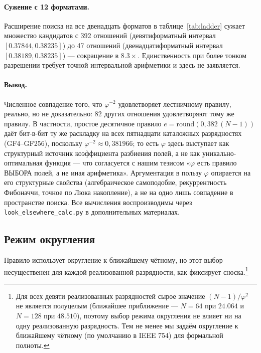 \documentclass[11pt,a4paper]{article}
\theoremstyle{plain}
\begin{document}
\paragraph{Сужение с 12 форматами.}
Расширение поиска на все двенадцать форматов в таблице~\ref{tab:ladder} сужает
множество кандидатов с 392 отношений (девятиформатный интервал
\([0.37844, 0.38235]\)) до 47 отношений (двенадцатиформатный интервал
\([0.38189, 0.38235]\)) --- сокращение в \(8.3\times\). Единственность при более
тонком разрешении требует точной интервальной арифметики и здесь не заявляется.

\paragraph{Вывод.}
Численное совпадение того, что \(\varphi^{-2}\) удовлетворяет лестничному
правилу, реально, но не доказательно: 82 других отношения удовлетворяют тому же
правилу. В частности, простое десятичное правило
\(e = \mathrm{round}(0{,}382\,(N-1))\) даёт бит-в-бит ту же раскладку
на всех пятнадцати каталожных разрядностях (GF4--GF256), поскольку
\(\varphi^{-2} \approx 0{,}381966\); то есть \(\varphi\) здесь выступает как
структурный источник коэффициента разбиения полей, а не как
уникально-оптимальная функция — что согласуется с нашим тезисом
«\(\varphi\) есть правило ВЫБОРА полей, а не иная арифметика».
Аргументация в пользу \(\varphi\) опирается на его структурные свойства
(алгебраическое самоподобие, рекуррентность Фибоначчи, точное по Люка
накопление), а не на одно лишь совпадение в пространстве поиска. Все вычисления
воспроизводимы через \texttt{look\_elsewhere\_calc.py} в дополнительных
материалах.

\subsection{Режим округления}
Правило использует округление к ближайшему чётному, но этот выбор несущественен
для каждой реализованной разрядности, как фиксирует сноска.\footnote{Для всех
девяти реализованных разрядностей сырое значение \((N-1)/\varphi^{2}\) не
является полуцелым (ближайшее приближение --- \(N = 64\) при \(24.064\) и
\(N = 128\) при \(48.510\)), поэтому выбор режима округления не влияет ни на одну
реализованную разрядность. Тем не менее мы задаём округление к ближайшему чётному
(по умолчанию в IEEE 754) для формальной полноты.}

\end{document}
